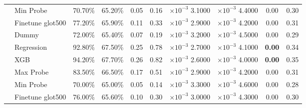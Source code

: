 \begin{tabular}{ll||cccccccc}
	                         & Min Probe        & 70.70\%                       & 65.20\%           & 0.05           & \multicolumn{1}{c|}{0.16}           & $\times 10^{-3}$ 3.1000           & $\times 10^{-3}$ 4.4000           & 0.00           & 0.30          \\
	                         & Finetune glot500 & 77.20\%                       & 65.90\%           & 0.11           & \multicolumn{1}{c|}{0.33}           & $\times 10^{-3}$ 2.9000           & $\times 10^{-3}$ 4.2000           & 0.00           & 0.31          \\\hhline{*{10}{-}}
	\multirow{6}{*}{Chinese} & Dummy            & 72.00\%                       & 65.40\%           & 0.07           & \multicolumn{1}{c|}{0.19}           & $\times 10^{-3}$ 3.2000           & $\times 10^{-3}$ 4.5000           & 0.00           & 0.29          \\
	                         & Regression       & 92.80\%                       & 67.50\%           & 0.25           & \multicolumn{1}{c|}{0.78}           & $\times 10^{-3}$ 2.7000           & $\times 10^{-3}$ 4.1000           & \bfseries 0.00 & 0.34          \\
	                         & XGB              & 94.20\%                       & 67.70\%           & 0.26           & \multicolumn{1}{c|}{0.82}           & $\times 10^{-3}$ 2.6000           & $\times 10^{-3}$ 4.0000           & \bfseries 0.00 & 0.35          \\
	                         & Max Probe        & 83.50\%                       & 66.50\%           & 0.17           & \multicolumn{1}{c|}{0.51}           & $\times 10^{-3}$ 2.9000           & $\times 10^{-3}$ 4.2000           & 0.00           & 0.31          \\
	                         & Min Probe        & 70.00\%                       & 65.00\%           & 0.05           & \multicolumn{1}{c|}{0.14}           & $\times 10^{-3}$ 3.3000           & $\times 10^{-3}$ 4.6000           & 0.00           & 0.28          \\
	                         & Finetune glot500 & 76.00\%                       & 65.60\%           & 0.10           & \multicolumn{1}{c|}{0.30}           & $\times 10^{-3}$ 3.0000           & $\times 10^{-3}$ 4.3000           & 0.00           & 0.30          
\end{tabular}

